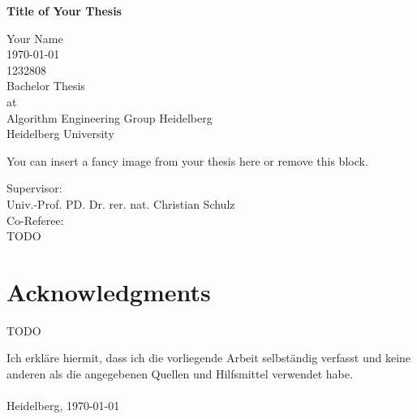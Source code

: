 \documentclass[a4paper,12pt,bibtotoc,titlepage, liststotoc,BCOR7mm,headsepline,pointlessnumbers]{scrbook}
\title{\upbtitel}
\author{
\upbautor
}
\date{\upbdate}
\newcommand{\upbautor}{Your Name} %
\newcommand{\upbtitel}{Title of Your Thesis} %
\newcommand{\upbtyp}{Bachelor Thesis} %
\newcommand{\upbmatrikelnr}{1232808} %
\newcommand{\upbzweitgutachter}{TODO} %
\theoremstyle{break} %
\begin{document}
\begin{titlepage}
\begin{center}
\vspace*{-0.75cm}
{\bf{ \huge{\upbtitel} }} \\

\vspace*{1.0cm}


\large{\upbautor}  \\
\vspace*{0.5cm}
\Large{\today}\\
\vspace*{0.5cm}
\upbmatrikelnr \\
\vspace*{1.0cm}
\upbtyp\\
\vspace*{0.25cm}
\normalsize
at \\
\vspace*{0.25cm}
Algorithm Engineering Group Heidelberg \\
Heidelberg University \\
\vspace*{0.25cm}

\vspace*{0.75cm}
\begin{center}
You can insert a fancy image from your thesis here or remove this block.
\end{center}
\vspace*{0.5cm}

Supervisor:\\
Univ.-Prof. PD. Dr. rer. nat. Christian Schulz \\
 
\vspace*{0.50cm}
Co-Referee: \\
 \upbzweitgutachter               

\end{center}
\end{titlepage}

\chapter*{Acknowledgments}
TODO

\vspace*{\fill}


Ich erkl\"are hiermit, dass ich die vorliegende Arbeit selbst\"andig verfasst und keine anderen als
die angegebenen Quellen und Hilfsmittel verwendet habe. \\ \\
Heidelberg, \today \\ \\  \\
\end{document}
